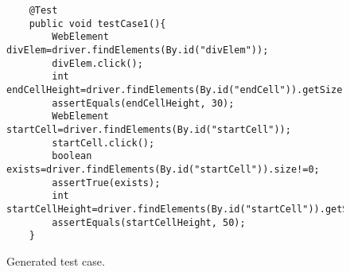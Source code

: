 \begin{figure}
\begin{lstlisting}
	@Test
	public void testCase1(){
		WebElement divElem=driver.findElements(By.id("divElem"));
		divElem.click();
		int endCellHeight=driver.findElements(By.id("endCell")).getSize().hight;
		assertEquals(endCellHeight, 30);
		WebElement startCell=driver.findElements(By.id("startCell"));
		startCell.click();
		boolean exists=driver.findElements(By.id("startCell")).size!=0;
		assertTrue(exists);
		int startCellHeight=driver.findElements(By.id("startCell")).getSize().height;
		assertEquals(startCellHeight, 50);
	}
\end{lstlisting}
\vspace{-0.1in} 

\caption{Generated \selenium test case.}
\label{Fig:domTestSample}
\vspace{-0.2in} 
\end{figure}